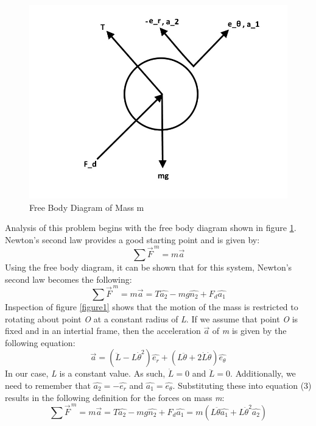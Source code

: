 \documentclass{article}
\begin{document}
\begin{figure}[h]
\centering
\includegraphics[width=1\textwidth]{FreeBody}
\caption{Free Body Diagram of Mass m}
\label{FreeBody}
\end{figure}

\pagebreak

	Analysis of this problem begins with the free body diagram shown in figure \ref{FreeBody}. Newton's second law provides a good starting point and is given by:
	\begin{equation}
	\sum \vec{F}^{\,m} = m\vec{a}
	\end{equation}
Using the free body diagram, it can be shown that for this system, Newton's second law becomes the following:
	\begin{equation}
	\sum \vec{F}^{\,m} = m\vec{a} = T\hat{a_2}-mg\hat{n_2}+F_d\hat{a_1}
	\end{equation}
	Inspection of figure \ref{figure1} shows that the motion of the mass is restricted to rotating about point \textit{O} at a constant radius of \textit{L}. If we assume that point \textit{O} is fixed and in an intertial frame, then the acceleration $\vec{a}$ of \textit{m} is given by the following equation:
	\begin{equation}
	\vec{a}=(\ddot{L} - L\dot{\theta}^2)\hat{e_r} + (L\ddot{\theta} + 2\dot{L}\dot{\theta})\hat{e_\theta}
	\end{equation}
	In our case, \textit{L} is a constant value. As such, $\dot{L} = 0$ and $\ddot{L} = 0$. Additionally, we need to remember that $\hat{a_2} = -\hat{e_r}$ and $\hat{a_1} = \hat{e_\theta}$. Substituting these into equation (3) results in the following definition for the forces on mass \textit{m}:
	\begin{equation}
	\sum \vec{F}^{\,m} = m\vec{a} = T\hat{a_2}-mg\hat{n_2}+F_d\hat{a_1} = m(L\ddot{\theta}\hat{a_1} + L\ddot{\theta}^2\hat{a_2})
	\end{equation}
	
\end{document}
